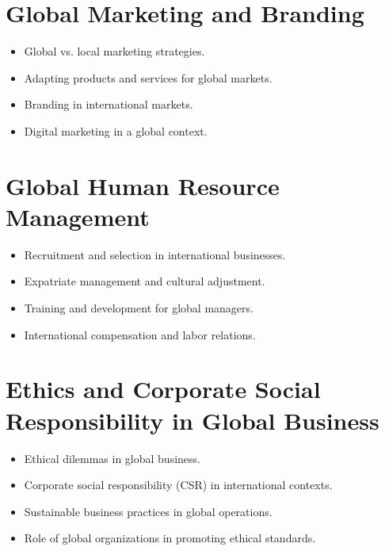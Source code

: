 \section{Global Marketing and Branding}
\begin{itemize}
    \item Global vs. local marketing strategies.
    \item Adapting products and services for global markets.
    \item Branding in international markets.
    \item Digital marketing in a global context.
\end{itemize}

\section{Global Human Resource Management}
\begin{itemize}
    \item Recruitment and selection in international businesses.
    \item Expatriate management and cultural adjustment.
    \item Training and development for global managers.
    \item International compensation and labor relations.
\end{itemize}

\section{Ethics and Corporate Social Responsibility in Global Business}
\begin{itemize}
    \item Ethical dilemmas in global business.
    \item Corporate social responsibility (CSR) in international contexts.
    \item Sustainable business practices in global operations.
    \item Role of global organizations in promoting ethical standards.
\end{itemize}

